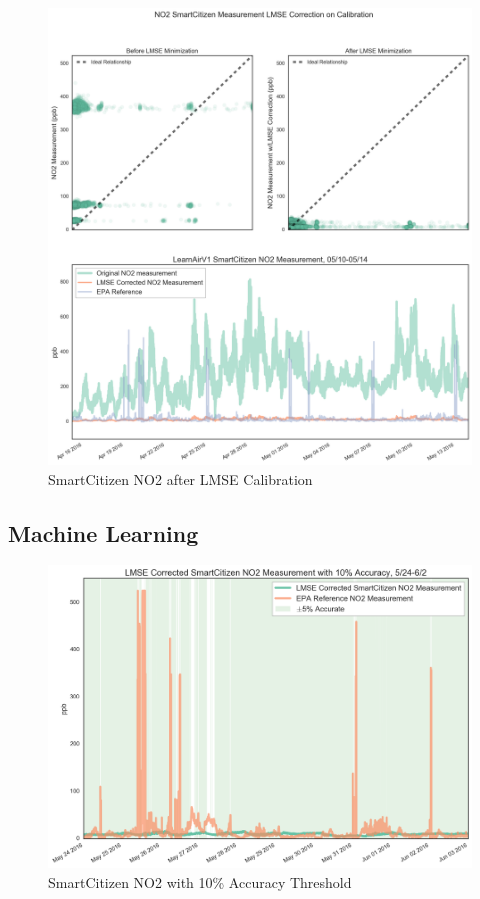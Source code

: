 \begin{figure}[htb]
 	\includegraphics[width=\textwidth]{figs/sck_no2_lmse}               
 	 \caption{SmartCitizen NO2 after LMSE Calibration}
  	\label{fig:sck_no2_lmse}
\end{figure}








\subsection{Machine Learning}


\begin{figure}[htb]
 	\includegraphics[width=\textwidth]{figs/sck_no2_with_10_accuracy_zoomed}               
 	 \caption{SmartCitizen NO2 with 10\% Accuracy Threshold}
  	\label{fig:sck_no2_with_10_accuracy_zoomed}
\end{figure}

